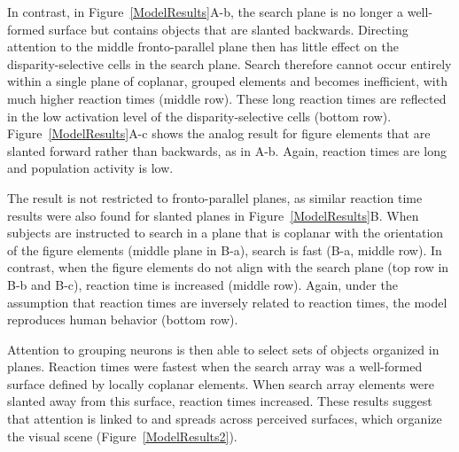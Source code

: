 \documentclass[conference]{IEEEtran}
\begin{document}
In contrast, in
Figure~\ref{ModelResults}A-b, the search plane is no longer a
well-formed surface but contains objects that are slanted
backwards. Directing attention to the middle fronto-parallel plane
then has little effect on the disparity-selective cells in the search
plane. 
%
 Search therefore cannot occur entirely
within a single plane of coplanar, grouped elements and becomes inefficient, with
much higher reaction times (middle row). These long reaction times are
reflected in the low activation level of the disparity-selective cells
(bottom row). Figure~\ref{ModelResults}A-c shows the analog result for
figure elements that are slanted forward rather than backwards, as in
A-b. Again, reaction times are long and population
activity is low. 

The result is not restricted to fronto-parallel planes, as similar
reaction time results were also found for slanted planes in
Figure~\ref{ModelResults}B. When subjects are instructed to search in
a plane that is coplanar with the orientation of the figure elements
(middle plane in B-a), search is fast (B-a, middle row). In contrast,
when the figure elements do not align with the search plane (top
row in B-b and B-c), reaction time is increased (middle row).  Again,
under the assumption that reaction times are inversely related to
reaction times, the model reproduces human behavior (bottom row).

Attention to grouping neurons is then able to select sets of objects
organized in planes. Reaction times were fastest when 
the search array was a well-formed surface defined by locally
coplanar elements. When search array elements were slanted away
from this surface, reaction times increased. These results
suggest that attention is linked to and spreads across perceived
surfaces, which organize the visual scene
(Figure~\ref{ModelResults2}). 
\end{document}
